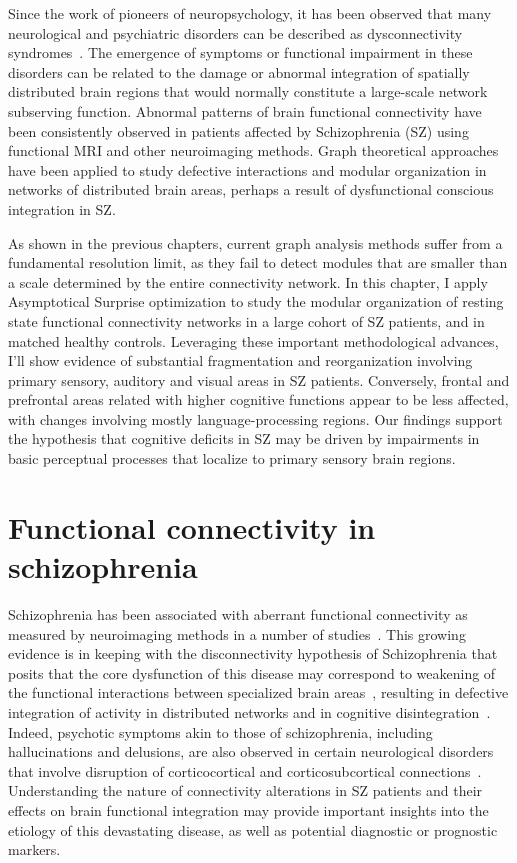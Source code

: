 Since the work of pioneers of neuropsychology, it has been observed that many neurological and psychiatric disorders can be described as dysconnectivity syndromes~\cite{catani2005}.
The emergence of symptoms or functional impairment in these disorders can be related to the damage or abnormal integration of spatially distributed brain regions that would normally constitute a large-scale network subserving function.
Abnormal patterns of brain functional connectivity have been consistently observed in patients affected by Schizophrenia (SZ) using functional MRI and other neuroimaging methods.
Graph theoretical approaches have been applied to study defective interactions and modular organization in networks of distributed brain areas, perhaps a result of dysfunctional conscious integration in SZ.

As shown in the previous chapters, current graph analysis methods suffer from a fundamental resolution limit, as they fail to detect modules that are smaller than a scale determined by the entire connectivity network.
In this chapter, I apply Asymptotical Surprise optimization to study the modular organization of resting state functional connectivity networks in a large cohort of SZ patients, and in matched healthy controls.
Leveraging these important methodological advances, I'll show evidence of substantial fragmentation and reorganization involving primary sensory, auditory and visual areas in SZ patients.
Conversely, frontal and prefrontal areas related with higher cognitive functions appear to be less affected, with changes involving mostly language-processing regions.
Our findings support the hypothesis that cognitive deficits in SZ may be driven by impairments in basic perceptual processes that localize to primary sensory brain regions.

\section{Functional connectivity in schizophrenia}
Schizophrenia has been associated with aberrant functional connectivity as measured by neuroimaging methods in a number of studies~\cite{friston1995,bullmore1998,liang2006,liu2008,calhoun2009,alexander-bloch2010,alexander-bloch2012,alexander-bloch2013}.
This growing evidence is in keeping with the disconnectivity hypothesis of Schizophrenia that posits that the core dysfunction of this disease may correspond to weakening of the functional interactions between specialized brain areas~\cite{ellison-wright2009,fornito2009,kubicki2005}, resulting in defective integration of activity in distributed networks and in cognitive disintegration~\cite{tononi2000}.
Indeed, psychotic symptoms akin to those of schizophrenia, including hallucinations and delusions, are also observed in certain neurological disorders that involve disruption of corticocortical and corticosubcortical connections~\cite{hyde1992}.
Understanding the nature of connectivity alterations in SZ patients and their effects on brain functional integration may provide important insights into the etiology of this devastating disease, as well as potential diagnostic or prognostic markers.

